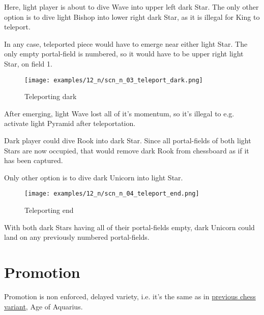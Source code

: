 Here, light player is about to dive Wave into upper left dark Star. The only
other option is to dive light Bishop into lower right dark Star, as it is
illegal for King to teleport.

In any case, teleported piece would have to emerge near either light Star.
The only empty portal-field is numbered, so it would have to be upper right
light Star, on field 1.

\clearpage %

\noindent
\begin{figure}[!h]
\texttt{[image: examples/12\_n/scn\_n\_03\_teleport\_dark.png]}
\caption{Teleporting dark}
\label{fig:scn_n_03_teleport_dark}
\end{figure}

After emerging, light Wave lost all of it's momentum, so it's illegal to
e.g. activate light Pyramid after teleportation.

Dark player could dive Rook into dark Star. Since all portal-fields of both
light Stars are now occupied, that would remove dark Rook from chessboard as
if it has been captured.

Only other option is to dive dark Unicorn into light Star.

\clearpage %

\noindent
\begin{figure}[!h]
\texttt{[image: examples/12\_n/scn\_n\_04\_teleport\_end.png]}
\caption{Teleporting end}
\label{fig:scn_n_04_teleport_end}
\end{figure}

With both dark Stars having all of their portal-fields empty, dark Unicorn could
land on any previously numbered portal-fields.

\clearpage %

\section*{Promotion}

Promotion is non enforced, delayed variety, i.e. it's the same as in
\hyperref[sec:Age of Aquarius/Promotion]{previous chess variant}, Age of Aquarius.

